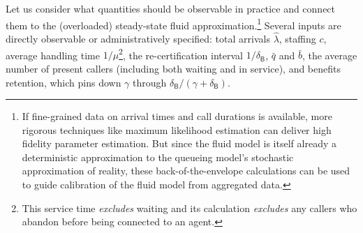 \documentclass[manuscript,screen,authorversion]{acmart}
\begin{document}
Let us consider what quantities should be observable in practice and connect them to the (overloaded) steady-state fluid approximation.\footnote{If fine-grained data on arrival times and call durations is available, more rigorous techniques like maximum likelihood estimation can deliver high fidelity parameter estimation. But since the fluid model is itself already a deterministic approximation to the queueing model's stochastic approximation of reality, these back-of-the-envelope calculations can be used to guide calibration of the fluid model from aggregated data.} %
Several inputs are directly observable or administratively specified: total arrivals $\hat{\lambda}$, staffing $c$, average handling time $1/\mu$\footnote{This service time \textit{excludes} waiting and its calculation \textit{excludes} any callers who abandon before being connected to an agent.}, the re-certification interval $1/\delta_\mathsf{B}$, $\bar{q}$ and $\bar{b}$, the average number of present callers (including both waiting and in service), and benefits retention, which pins down $\gamma$ through $\delta_\mathsf{B}/(\gamma+\delta_\mathsf{B})$. 
\end{document}
